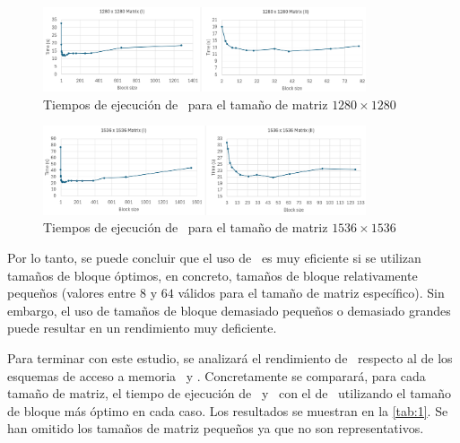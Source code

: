 \begin{figure}[h]
    \centering
    \includegraphics[width=0.85\textwidth]{img/4.png}
    \caption{Tiempos de ejecución de \zorder\ para el tamaño de matriz $1280 \times 1280$}
    \label{fig:4}
\end{figure}

\newpage

\begin{figure}[h]
    \centering
    \includegraphics[width=0.85\textwidth]{img/5.png}
    \caption{Tiempos de ejecución de \zorder\ para el tamaño de matriz $1536 \times 1536$}
    \label{fig:5}
\end{figure}

Por lo tanto, se puede concluir que el uso de \zorder\ es muy eficiente si se utilizan tamaños de bloque óptimos, 
en concreto, tamaños de bloque relativamente pequeños (valores entre $8$ y $64$ válidos para el tamaño de matriz específico).
Sin embargo, el uso de tamaños de bloque demasiado pequeños o demasiado grandes puede resultar en un rendimiento muy deficiente.

Para terminar con este estudio, se analizará el rendimiento de \zorder\ respecto al de los esquemas de acceso a memoria \rowmajor\ y \colmajor.
Concretamente se comparará, para cada tamaño de matriz, el tiempo de ejecución de \rowmajor\ y \colmajor\ con el de \zorder\ 
utilizando el tamaño de bloque más óptimo en cada caso. Los resultados se muestran en la \autoref{tab:1}. Se han omitido los tamaños 
de matriz pequeños ya que no son representativos.

